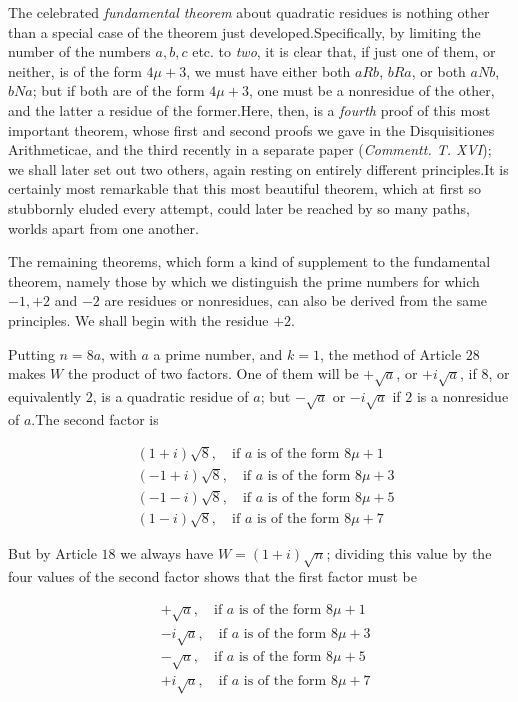 The celebrated \textit{fundamental theorem} about quadratic residues is nothing other than a special case of the theorem just developed.\quad Specifically, by limiting the number of the numbers $a,b,c$ etc. to \textit{two}, it is clear that, if just one of them, or neither, is of the form $4\mu+3$, we must have either both $aRb$, $bRa$, or both $aNb$, $bNa$; but if both are of the form $4\mu+3$, one must be a nonresidue of the other, and the latter a residue of the former.\quad Here, then, is a \textit{fourth} proof of this most important theorem, whose first and second proofs we gave in the Disquisitiones Arithmeticae, and the third recently in a separate paper (\textit{Commentt. T. XVI}); we shall later set out two others, again resting on entirely different principles.\quad It is certainly most remarkable that this most beautiful theorem, which at first so stubbornly eluded every attempt, could later be reached by so many paths, worlds apart from one another.


The remaining theorems, which form a kind of supplement to the fundamental theorem, namely those by which we distinguish the prime numbers for which $-1,+2$ and $-2$ are residues or nonresidues, can also be derived from the same principles. We shall begin with the residue $+2$.

Putting $n=8a$, with $a$ a prime number, and $k=1$, the method of Article $28$ makes $W$ the product of two factors. One of them will be $+\surd a$, or $+i\surd a$, if $8$, or equivalently $2$, is a quadratic residue of $a$; but $-\surd a$ or $-i\surd a$ if $2$ is a nonresidue of $a$.\quad The second factor is

\[
\begin{aligned}
&(1+i)\surd8,\quad\text{if }a\text{ is of the form }8\mu+1\\
&(-1+i)\surd8,\quad\text{if }a\text{ is of the form }8\mu+3\\
&(-1-i)\surd8,\quad\text{if }a\text{ is of the form }8\mu+5\\
&(1-i)\surd8,\quad\text{if }a\text{ is of the form }8\mu+7
\end{aligned}
\]

But by Article $18$ we always have $W=(1+i)\surd n$; dividing this value by the four values of the second factor shows that the first factor must be

\[
\begin{aligned}
&+\surd a,\quad\text{if }a\text{ is of the form }8\mu+1\\
&-i\surd a,\quad\text{if }a\text{ is of the form }8\mu+3\\
&-\surd a,\quad\text{if }a\text{ is of the form }8\mu+5\\
&+i\surd a,\quad\text{if }a\text{ is of the form }8\mu+7
\end{aligned}
\]

